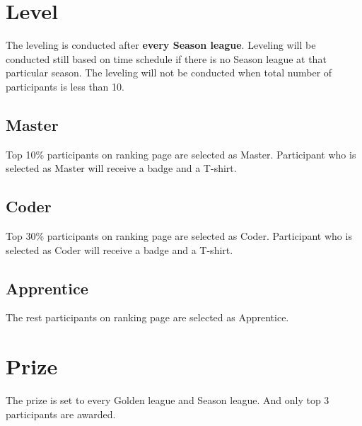 \documentclass{article}
\begin{document}
\section{Level}

The leveling is conducted after \textbf{every Season league}. Leveling will be conducted still based on time schedule if there is no Season league at that particular season. The leveling will not be conducted when total number of participants is less than 10.

\subsection{Master}

Top 10\% participants on ranking page are selected as Master. Participant who is selected as Master will receive a badge and a T-shirt.

\subsection{Coder}

Top 30\% participants on ranking page are selected as Coder. Participant who is selected as Coder will receive a badge and a T-shirt.

\subsection{Apprentice}

The rest participants on ranking page are selected as Apprentice.

\section{Prize}

The prize is set to every Golden league and Season league. And only top 3 participants are awarded.
\end{document}
